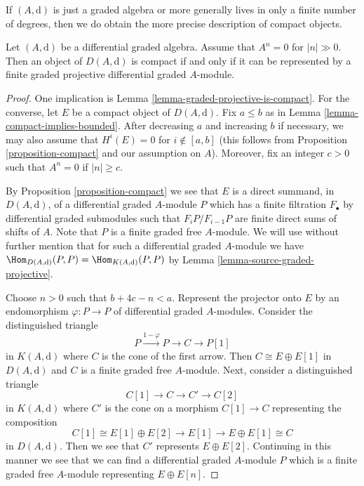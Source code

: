 \noindent
If $(A, \text{d})$ is just a graded algebra or more generally lives in
only a finite number of degrees, then we do obtain the
more precise description of compact objects.

\begin{lemma}
\label{lemma-compact}
Let $(A, \text{d})$ be a differential graded algebra.
Assume that $A^n = 0$ for $|n| \gg 0$.
Then an object of $D(A, \text{d})$ is compact if and only
if it can be represented by a finite graded projective differential
graded $A$-module.
\end{lemma}

\begin{proof}
One implication is Lemma \ref{lemma-graded-projective-is-compact}.
For the converse, let $E$ be a compact object of $D(A, \text{d})$.
Fix $a \leq b$ as in Lemma \ref{lemma-compact-implies-bounded}.
After decreasing $a$ and increasing $b$ if necessary, we may also
assume that $H^i(E) = 0$ for $i \not \in [a, b]$ (this follows
from Proposition \ref{proposition-compact} and our assumption on $A$).
Moreover, fix an integer $c > 0$ such that $A^n = 0$ if $|n| \geq c$.

\medskip\noindent
By Proposition \ref{proposition-compact} we see that $E$ is a direct
summand, in $D(A, \text{d})$, of a differential graded $A$-module $P$
which has a finite filtration $F_\bullet$ by differential
graded submodules such that $F_iP/F_{i - 1}P$ are finite direct sums
of shifts of $A$. Note that $P$ is a finite graded free $A$-module.
We will use without further mention that for such a
differential graded $A$-module we have
$\Hom_{D(A, \text{d})}(P, P) = \Hom_{K(A, \text{d})}(P, P)$ by
Lemma \ref{lemma-source-graded-projective}.

\medskip\noindent
Choose $n > 0$ such that $b + 4c - n < a$.
Represent the projector onto $E$ by an endomorphism $\varphi : P \to P$ of
differential graded $A$-modules. Consider the distinguished triangle
$$
P \xrightarrow{1 - \varphi} P \to C \to P[1]
$$
in $K(A, \text{d})$ where $C$ is the cone of the first arrow. Then
$C \cong E \oplus E[1]$ in $D(A, \text{d})$ and $C$ is a finite graded free
$A$-module. Next, consider a distinguished triangle
$$
C[1] \to C \to C' \to C[2]
$$
in $K(A, \text{d})$ where $C'$ is the cone on a morphism $C[1] \to C$
representing the composition
$$
C[1] \cong E[1] \oplus E[2] \to E[1] \to E \oplus E[1] \cong C
$$
in $D(A, \text{d})$. Then we see that $C'$ represents $E \oplus E[2]$.
Continuing in this manner we see that we can find a differential
graded $A$-module $P$ which is a finite graded free $A$-module
representing $E \oplus E[n]$.


\end{proof}
